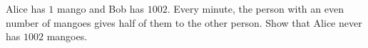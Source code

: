 Alice has $1$ mango and Bob has $1002$. Every minute, the person with an even number of mangoes gives half of them to the other person. Show that Alice never has $1002$ mangoes.
